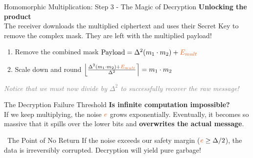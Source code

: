 \documentclass[aspectratio=169, 10pt]{beamer}
\begin{document}
\begin{frame}{Homomorphic Multiplication: Step 3 - The Magic of Decryption}
    \Large
    \textbf{Unlocking the product} \\
    \vspace{0.2cm}
    \normalsize
    The receiver downloads the multiplied ciphertext and uses their Secret Key to remove the complex mask. They are left with the multiplied payload!
    \vspace{0.2cm}
    
    \begin{block}{\faUnlock \ 1. Remove the combined mask}
        \centering
        \vspace{0.15cm}
        \large $\text{Payload} = \Delta^2(m_1 \cdot m_2) + \textcolor{AccentOrange}{{E_{mult}}}$
        \vspace{0.15cm}
    \end{block}
    \vspace{0.2cm}
    
    \begin{exampleblock}{\faCheckCircle \ 2. Scale down and round}
        \centering
        \vspace{0.15cm}
        \large $\left\lfloor \frac{\Delta^2(m_1 \cdot m_2) + \textcolor{AccentOrange}{{E_{mult}}}}{{\Delta^2}} \right\rceil = {m_1 \cdot m_2}$
        \vspace{0.15cm}
    \end{exampleblock}
    \vspace{0.1cm}
    \centering
    \textit{\textcolor{gray}{\small Notice that we must now divide by $\Delta^2$ to successfully recover the raw message!}}
\end{frame}

\begin{frame}{The Decryption Failure Threshold}
    \Large
    \textbf{Is infinite computation impossible?} \\[0.4cm]

    \normalsize
    If we keep multiplying, the noise $\textcolor{AccentOrange}{{e}}$ grows exponentially. Eventually, it becomes so massive that it spills over the lower bits and \textbf{overwrites the actual message}.
    \vspace{0.5cm}
    
    \begin{alertblock}{\faSkullCrossbones \ The Point of No Return}
        If the noise exceeds our safety margin ($\textcolor{AccentOrange}{{e}} \ge \Delta / 2$), the data is irreversibly corrupted. Decryption will yield pure garbage!
    \end{alertblock}
\end{frame}
\end{document}
